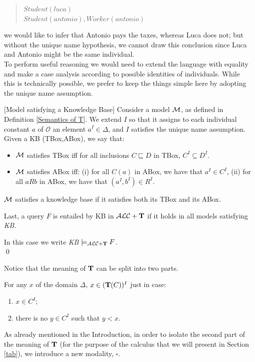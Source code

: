 \documentclass[a4paper, 11pt, oneside]{duthesis}
\newcommand{\tip}{{\bf T}}
\newcommand{\alct}{\mathcal{ALC}+\tip}
\newcommand{\bbox}{\square}
\newcommand{\emme} {\begin{mathcal}M\end{mathcal}}
\newenvironment{definition}
{\begin{defi} \rm}{\qed \end{defi}}
\newenvironment{definition}
{\begin{defi} \rm}{\qed \end{defi}}
\newtheorem{definition}{Definition}
\newcounter{posu}
\newtheorem{definition}[posu]{Definition}
\begin{document}
\begin{quote}
$\mathit{Student}(\mathit{luca})$ \\
$\mathit{Student}(\mathit{antonio}), \mathit{Worker}(\mathit{antonio})$
\end{quote}

\noindent we would like to infer that Antonio pays the taxes, whereas Luca does not; but without the unique name hypothesis, we cannot draw this conclusion since Luca and Antonio might be the same individual.\\

To perform useful reasoning we would need to  extend the language with equality and make a case analysis according to possible identities of individuals. While this is technically possible, we prefer to keep the things simple here by adopting the unique name assumption.

\begin{definition}[Model satisfying a Knowledge Base]\label{Def-ModelSatTBox-ABox} Consider a model $\emme$, as defined in Definition \ref{Semantics of T}.
We extend $I$ so that it assigns to each individual constant $a$ of $\mathcal{O}$ an element $a^I \in \Delta$,  and $I$ satisfies the unique name assumption. Given a KB (TBox,ABox), we say that:

\begin{itemize}
\item $\emme$  satisfies TBox iff  for all  inclusions $C \sqsubseteq D$  in TBox, $C^I \subseteq D^I$.
\item $\emme$ satisfies ABox  iff:
(i) for all $C(a)$  in ABox, we have that $a^I \in C^I$,
(ii) for all $aRb$ in ABox, we have that $(a^I,b^I) \in R^I$.
\end{itemize}

\noindent $\emme$ satisfies a knowledge base if it satisfies both its TBox and its ABox.

Last, a query $F$  is  entailed by KB in $\alct$ if it holds in all models satisfying \emph{KB}.

In this case we write \emph{KB} $\models_{\alct} F$.\\
\end{definition}


\noindent Notice that the meaning of $\tip$ can be split into two parts.

For any $x$ of the domain $\Delta$,  $x \in (\tip(C))^I$ just in case:
\begin{enumerate}
\item $x \in C^I$;
\item there is no $y \in C^I$ such that $y < x$.
\end{enumerate}
As already mentioned in the Introduction, in order to isolate the second part of the meaning of $\tip$ (for the purpose of the calculus that we will present in Section \ref{tab}), we introduce a new modality, $\bbox$.\\
\end{document}
